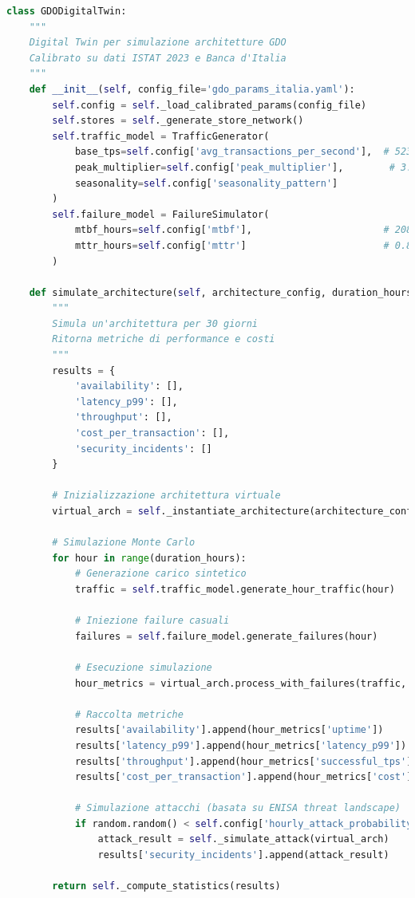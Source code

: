 \begin{lstlisting}[language=Python, caption={Core Engine del Digital Twin GDO}]
class GDODigitalTwin:
    """
    Digital Twin per simulazione architetture GDO
    Calibrato su dati ISTAT 2023 e Banca d'Italia
    """
    def __init__(self, config_file='gdo_params_italia.yaml'):
        self.config = self._load_calibrated_params(config_file)
        self.stores = self._generate_store_network()
        self.traffic_model = TrafficGenerator(
            base_tps=self.config['avg_transactions_per_second'],  # 523 TPS
            peak_multiplier=self.config['peak_multiplier'],        # 3.7x
            seasonality=self.config['seasonality_pattern']
        )
        self.failure_model = FailureSimulator(
            mtbf_hours=self.config['mtbf'],                       # 2087 ore
            mttr_hours=self.config['mttr']                        # 0.84 ore
        )
        
    def simulate_architecture(self, architecture_config, duration_hours=720):
        """
        Simula un'architettura per 30 giorni
        Ritorna metriche di performance e costi
        """
        results = {
            'availability': [],
            'latency_p99': [],
            'throughput': [],
            'cost_per_transaction': [],
            'security_incidents': []
        }
        
        # Inizializzazione architettura virtuale
        virtual_arch = self._instantiate_architecture(architecture_config)
        
        # Simulazione Monte Carlo
        for hour in range(duration_hours):
            # Generazione carico sintetico
            traffic = self.traffic_model.generate_hour_traffic(hour)
            
            # Iniezione failure casuali
            failures = self.failure_model.generate_failures(hour)
            
            # Esecuzione simulazione
            hour_metrics = virtual_arch.process_with_failures(traffic, failures)
            
            # Raccolta metriche
            results['availability'].append(hour_metrics['uptime'])
            results['latency_p99'].append(hour_metrics['latency_p99'])
            results['throughput'].append(hour_metrics['successful_tps'])
            results['cost_per_transaction'].append(hour_metrics['cost'])
            
            # Simulazione attacchi (basata su ENISA threat landscape)
            if random.random() < self.config['hourly_attack_probability']:  # 0.0037
                attack_result = self._simulate_attack(virtual_arch)
                results['security_incidents'].append(attack_result)
        
        return self._compute_statistics(results)
\end{lstlisting}

